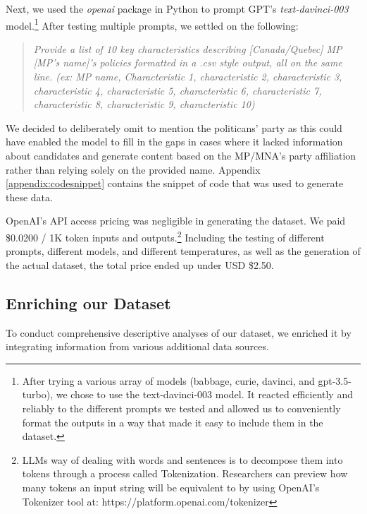 \documentclass{article}
\begin{document}
Next, we used the \textit{openai} package in Python to prompt GPT's \textit{text-davinci-003} model.\footnote{After trying a various array of models (babbage, curie, davinci, and gpt-3.5-turbo), we chose to use the text-davinci-003 model. It reacted efficiently and reliably to the different prompts we tested and allowed us to conveniently format the outputs in a way that made it easy to include them in the dataset.} After testing multiple prompts, we settled on the following:

\begin{quote}
    \textit{Provide a list of 10 key characteristics describing [Canada/Quebec] MP [MP's name]'s policies formatted in a .csv style output, all on the same line. (ex: MP name, Characteristic 1, characteristic 2, characteristic 3, characteristic 4, characteristic 5, characteristic 6, characteristic 7, characteristic 8, characteristic 9, characteristic 10)}
\end{quote}

We decided to deliberately omit to mention the politicans' party as this could have enabled the model to fill in the gaps in cases where it lacked information about candidates and generate content based on the MP/MNA's party affiliation rather than relying solely on the provided name. Appendix \ref{appendix:codesnippet} contains the snippet of code that was used to generate these data.

OpenAI's API access pricing was negligible in generating the dataset. We paid \$0.0200 / 1K token inputs and outputs.\footnote{LLMs way of dealing with words and sentences is to decompose them into tokens through a process called Tokenization.\parencite{maeda_bolanos23} Researchers can preview how many tokens an input string will be equivalent to by using OpenAI's Tokenizer tool at: https://platform.openai.com/tokenizer} Including the testing of different prompts, different models, and different temperatures, as well as the generation of the actual dataset, the total price ended up under USD \$2.50.

\subsection{Enriching our Dataset}

To conduct comprehensive descriptive analyses of our dataset, we enriched it by integrating information from various additional data sources.
\end{document}
